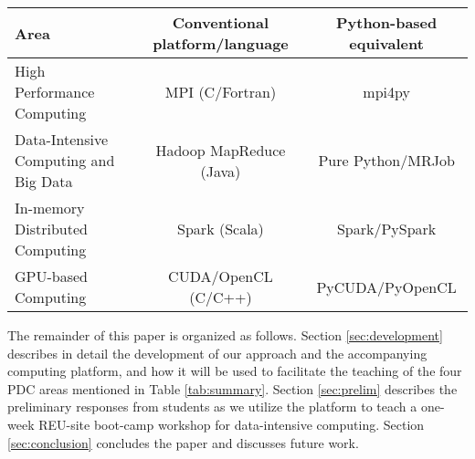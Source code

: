 \begin{table*}
\caption{PDC Areas, their conventional platform/language for educational purpose,
    and the corresponding Python platforms/libraries}
\label{tab:summary}
\centering
\begin{tabular}{|l|c|c|}
\hline
    Area & Conventional platform/language & Python-based equivalent \\
\hline
    High Performance Computing & MPI (C/Fortran) & mpi4py \\
\hline
    Data-Intensive Computing and Big Data  & Hadoop MapReduce (Java) & Pure Python/MRJob \\
\hline
    In-memory Distributed Computing & Spark (Scala) & Spark/PySpark \\
\hline
    GPU-based Computing & CUDA/OpenCL (C/C++) & PyCUDA/PyOpenCL \\
\hline
\end{tabular}
\end{table*}
The remainder of this paper is organized as follows. Section \ref{sec:development} describes in detail the development of our approach and the accompanying computing platform, and how it will be used to facilitate the teaching of the four PDC areas mentioned in Table \ref{tab:summary}. Section \ref{sec:prelim} describes the preliminary responses from students as we utilize the platform to teach a one-week REU-site boot-camp workshop for data-intensive computing. Section \ref{sec:conclusion} concludes the paper and discusses future work.

